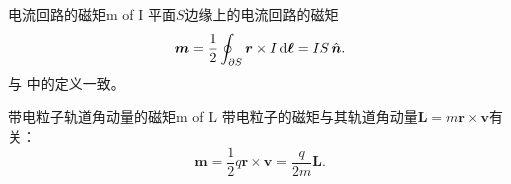 \begin{example}
    {电流回路的磁矩}{m of I}
    平面$S$边缘上的电流回路的磁矩
    \begin{equation}
        \label{eq:ed-current-loop-dipole}
        \bm m = \frac12\oint_{\partial S}\bm r \times I\mathop{}\!\mathrm{d}\bm\ell = IS\mathop{}\!\hat{\bm{n}}.
    \end{equation}
    与 中的定义一致。
\end{example}

\begin{example}
    {带电粒子轨道角动量的磁矩}{m of L}
    带电粒子的磁矩与其轨道角动量$\bm L = m\bm r \times \bm v$有关：
    \begin{equation}
        \label{eq:ed-orbital-gyromagnetic-ratio}
        \bm m = \frac12q\bm r \times \bm v = \frac q{2m}\bm L.
    \end{equation}
\end{example}

